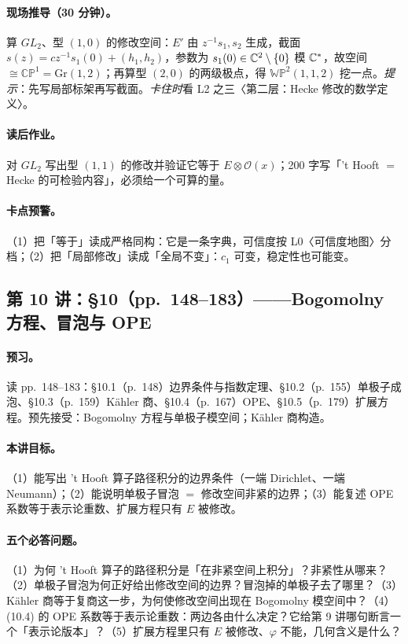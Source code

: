 {\paragraph{现场推导（30 分钟）。}算 \(GL_2\)、型 \((1,0)\) 的修改空间：\(E'\) 由 \(z^{-1}s_1,s_2\) 生成，截面 \(s(z)=cz^{-1}s_1(0)+(h_1,h_2)\)，参数为 \(s_1(0)\in\mathbb{C}^{2}\setminus\{0\}\) 模 \(\mathbb{C}^{*}\)，故空间 \(\cong\mathbb{CP}^1=\mathrm{Gr}(1,2)\)；再算型 \((2,0)\) 的两级极点，得 \(\mathbb{WP}^{2}(1,1,2)\) 挖一点。\emph{提示}：先写局部标架再写截面。\emph{卡住时}看 L2 之三〈第二层：Hecke 修改的数学定义〉。\pC

\paragraph{读后作业。}对 \(GL_2\) 写出型 \((1,1)\) 的修改并验证它等于 \(E\otimes\mathcal O(x)\)；200 字写「't Hooft \(=\) Hecke 的可检验内容」，必须给一个可算的量。\pC

\paragraph{卡点预警。}（1）把「等于」读成严格同构：它是一条字典，可信度按 L0〈可信度地图〉分档；（2）把「局部修改」读成「全局不变」：\(c_1\) 可变，稳定性也可能变。\pC

\subsection{第 10 讲：\S10（pp.~148--183）——Bogomolny 方程、冒泡与 OPE}

\paragraph{预习。}读 pp.~148--183：§10.1（p.~148）边界条件与指数定理、§10.2（p.~155）单极子成泡、§10.3（p.~159）Kähler 商、§10.4（p.~167）OPE、§10.5（p.~179）扩展方程。预先接受：Bogomolny 方程与单极子模空间；Kähler 商构造。\pC

\paragraph{本讲目标。}（1）能写出 't Hooft 算子路径积分的边界条件（一端 Dirichlet、一端 Neumann）；（2）能说明单极子冒泡 \(=\) 修改空间非紧的边界；（3）能复述 OPE 系数等于表示论重数、扩展方程只有 \(E\) 被修改。\pC

\paragraph{五个必答问题。}（1）为何 't Hooft 算子的路径积分是「在非紧空间上积分」？非紧性从哪来？（2）单极子冒泡为何正好给出修改空间的边界？冒泡掉的单极子去了哪里？（3）Kähler 商等于复商这一步，为何使修改空间出现在 Bogomolny 模空间中？（4）(10.4) 的 OPE 系数等于表示论重数：两边各由什么决定？它给第 9 讲哪句断言一个「表示论版本」？（5）扩展方程里只有 \(E\) 被修改、\(\varphi\) 不能，几何含义是什么？\pC

}
